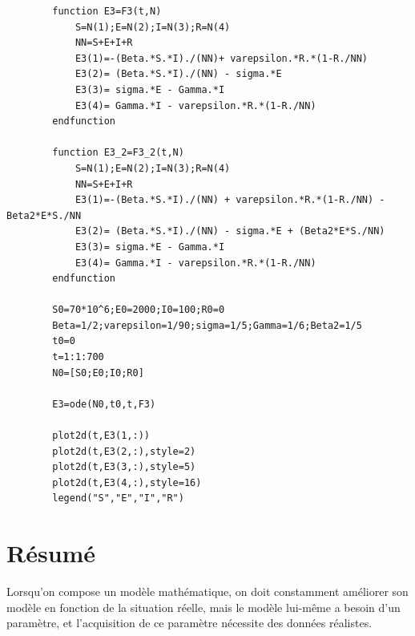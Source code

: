 \documentclass[11pt]{article}
\begin{document}
    \begin{verbatim}
        function E3=F3(t,N)
            S=N(1);E=N(2);I=N(3);R=N(4)
            NN=S+E+I+R
            E3(1)=-(Beta.*S.*I)./(NN)+ varepsilon.*R.*(1-R./NN)
            E3(2)= (Beta.*S.*I)./(NN) - sigma.*E 
            E3(3)= sigma.*E - Gamma.*I
            E3(4)= Gamma.*I - varepsilon.*R.*(1-R./NN)
        endfunction

        function E3_2=F3_2(t,N)
            S=N(1);E=N(2);I=N(3);R=N(4)
            NN=S+E+I+R
            E3(1)=-(Beta.*S.*I)./(NN) + varepsilon.*R.*(1-R./NN) -Beta2*E*S./NN
            E3(2)= (Beta.*S.*I)./(NN) - sigma.*E + (Beta2*E*S./NN)
            E3(3)= sigma.*E - Gamma.*I
            E3(4)= Gamma.*I - varepsilon.*R.*(1-R./NN)
        endfunction

        S0=70*10^6;E0=2000;I0=100;R0=0
        Beta=1/2;varepsilon=1/90;sigma=1/5;Gamma=1/6;Beta2=1/5
        t0=0
        t=1:1:700
        N0=[S0;E0;I0;R0]

        E3=ode(N0,t0,t,F3)

        plot2d(t,E3(1,:))
        plot2d(t,E3(2,:),style=2)
        plot2d(t,E3(3,:),style=5)
        plot2d(t,E3(4,:),style=16)
        legend("S","E","I","R")
    \end{verbatim}
    \section*{Résumé}
    Lorsqu'on compose un modèle mathématique, on doit constamment améliorer son modèle en fonction de la situation réelle, mais le modèle lui-même a besoin d'un paramètre, et l'acquisition de ce paramètre nécessite des données réalistes.
\end{document}
